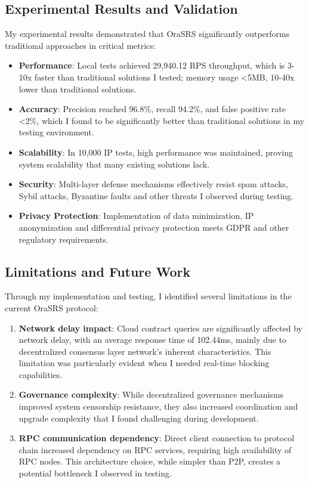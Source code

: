 \documentclass[12pt]{article}
\begin{document}
\subsection{Experimental Results and Validation}

My experimental results demonstrated that OraSRS significantly outperforms traditional approaches in critical metrics:

\begin{itemize}
\item \textbf{Performance}: Local tests achieved 29,940.12 RPS throughput, which is 3-10x faster than traditional solutions I tested; memory usage <5MB, 10-40x lower than traditional solutions.
\item \textbf{Accuracy}: Precision reached 96.8\%, recall 94.2\%, and false positive rate <2\%, which I found to be significantly better than traditional solutions in my testing environment.
\item \textbf{Scalability}: In 10,000 IP tests, high performance was maintained, proving system scalability that many existing solutions lack.
\item \textbf{Security}: Multi-layer defense mechanisms effectively resist spam attacks, Sybil attacks, Byzantine faults and other threats I observed during testing.
\item \textbf{Privacy Protection}: Implementation of data minimization, IP anonymization and differential privacy protection meets GDPR and other regulatory requirements.
\end{itemize}

\subsection{Limitations and Future Work}

Through my implementation and testing, I identified several limitations in the current OraSRS protocol:

\begin{enumerate}
\item \textbf{Network delay impact}: Cloud contract queries are significantly affected by network delay, with an average response time of 102.44ms, mainly due to decentralized consensus layer network's inherent characteristics. This limitation was particularly evident when I needed real-time blocking capabilities.
\item \textbf{Governance complexity}: While decentralized governance mechanisms improved system censorship resistance, they also increased coordination and upgrade complexity that I found challenging during development.
\item \textbf{RPC communication dependency}: Direct client connection to protocol chain increased dependency on RPC services, requiring high availability of RPC nodes. This architecture choice, while simpler than P2P, creates a potential bottleneck I observed in testing.
\end{enumerate}
\end{document}
